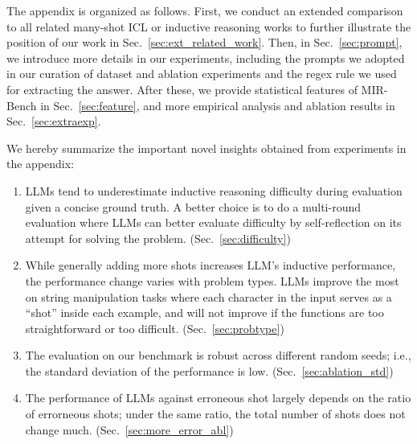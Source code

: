 \appendix
The appendix is organized as follows. First, we conduct an extended comparison to all related many-shot ICL or inductive reasoning works to further illustrate the position of our work in Sec.~\ref{sec:ext_related_work}. Then, in Sec.~\ref{sec:prompt}, we introduce more details in our experiments, including the prompts we adopted in our curation of dataset and ablation experiments and the regex rule we used for extracting the answer. After these, we provide statistical features of MIR-Bench in Sec.~\ref{sec:feature}, and more empirical analysis and ablation results in Sec.~\ref{sec:extraexp}. 

We hereby summarize the important novel insights obtained from experiments in the appendix:

\begin{enumerate}

    \item LLMs tend to underestimate inductive reasoning difficulty during evaluation given a concise ground truth. A better choice is to do a multi-round evaluation where LLMs can better evaluate difficulty by self-reflection on its attempt for solving the problem. (Sec.~\ref{sec:difficulty})

    \item While generally adding more shots increases LLM's inductive performance, the performance change varies with problem types. LLMs improve the most on string manipulation tasks where each character in the input serves as a ``shot'' inside each example, and will not improve if the functions are too straightforward or too difficult.  (Sec.~\ref{sec:probtype})
    
    \item The evaluation on our benchmark is robust across different random seeds; i.e., the standard deviation of the performance is low. (Sec.~\ref{sec:ablation_std})

    \item The performance of LLMs against erroneous shot largely depends on the ratio of errorneous shots; under the same ratio, the total number of shots does not change much. (Sec.~\ref{sec:more_error_abl})
    
\end{enumerate}


